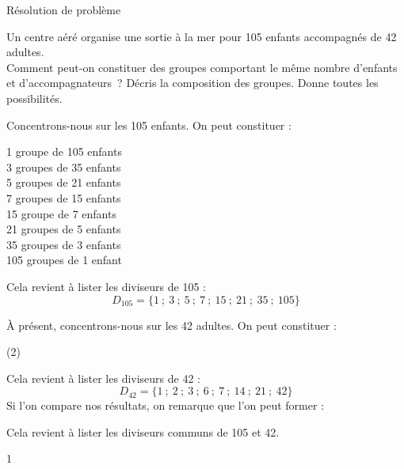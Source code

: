 \documentclass[a4paper,11pt]{report}
\begin{document}
\begin{resolu}{Résolution de problème}{Un centre aéré organise une sortie à la mer pour 105 enfants accompagnés de 42 adultes. \\ Comment peut-on constituer des groupes comportant le même nombre d'enfants et d'accompagnateurs~? Décris la composition des groupes. Donne toutes les possibilités. \\

{\color{blue} 
    Concentrons-nous sur les 105 enfants. On peut constituer :
    \begin{center}
        \begin{multicols}{2}
            1 groupe de 105 enfants \\
            3 groupes de 35 enfants \\
            5 groupes de 21 enfants \\
            7 groupes de 15 enfants \\
            15 groupe de 7 enfants\\
            21 groupes de 5 enfants \\
            35 groupes de 3 enfants \\
            105 groupes de 1 enfant \\
        \end{multicols}
    \end{center}

Cela revient à lister les diviseurs de 105 : 
\[D_{105}=\{1~;~3~;~5~;~7~;~15~;~21~;~35~;~105\}\]

    À présent, concentrons-nous sur les 42 adultes. On peut constituer :
    
    \begin{tasks}(2)
    \end{tasks}
    \bigskip
    
    Cela revient à lister les diviseurs de 42 : 
    \[D_{42}=\{1~;~2~;~3~;~6~;~7~;~14~;~21~;~42\}\]
    Si l'on compare nos résultats, on remarque que l'on peut former : 
 \begin{tasks}
\end{tasks}
\bigskip
    Cela revient à lister les diviseurs communs de 105 et 42.

}

}{1}\end{resolu}
\end{document}
